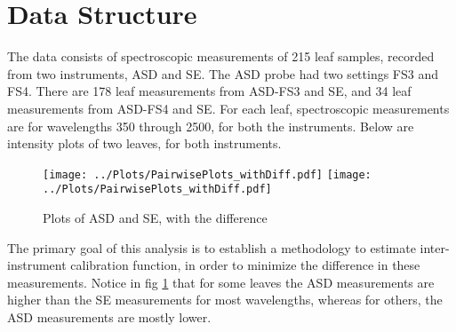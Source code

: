 \section*{Data Structure} \label{Sec_Data}

The data consists of spectroscopic measurements of 215 leaf samples, recorded from two instruments, ASD and SE. The ASD probe had two settings FS3 and FS4. There are 178 leaf measurements from ASD-FS3 and SE, and 34 leaf measurements from ASD-FS4 and SE. For each leaf, spectroscopic measurements are for wavelengths 350 through 2500, for both the instruments. Below are intensity plots of two leaves, for both instruments. 
\begin{figure}[H]
\centering
\texttt{[image: ../Plots/PairwisePlots\_withDiff.pdf]}
\texttt{[image: ../Plots/PairwisePlots\_withDiff.pdf]}
\caption{Plots of ASD and SE, with the difference}
\label{fig:Fig2.1}
\end{figure}
The primary goal of this analysis is to establish a methodology to estimate inter-instrument calibration function, in order to minimize the difference in these measurements. Notice in fig \ref{fig:Fig2.1} that for some leaves the ASD measurements are higher than the SE measurements for most wavelengths, whereas for others, the ASD measurements are mostly lower. 

